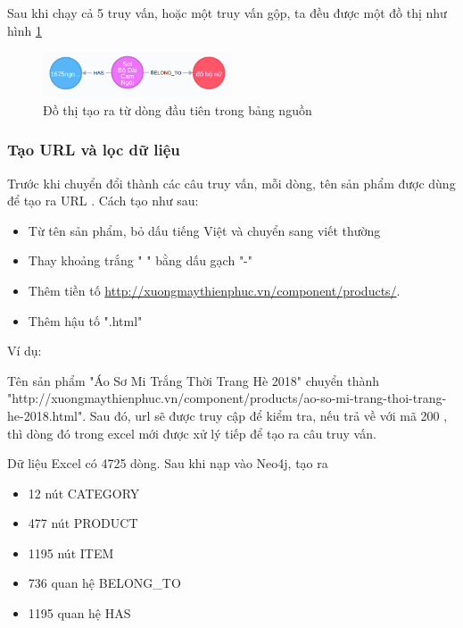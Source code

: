 \bigskip

Sau khi chạy cả 5 truy vấn, hoặc một truy vấn gộp, ta đều được một đồ thị như hình \ref{fig:cypher} 

\begin{figure}[h]
\centering
\includegraphics[width=0.5\textwidth]{imagev2/merge5cypher.png}
\caption{\label{fig:cypher} Đồ thị tạo ra từ dòng đầu tiên trong bảng nguồn}
\end{figure}

\subsubsection{Tạo URL và lọc dữ liệu}

Trước khi chuyển đổi thành các câu truy vấn, mỗi dòng, tên sản phẩm được dùng để tạo ra URL . Cách tạo như sau: 

\begin{itemize}
\item Từ tên sản phẩm, bỏ dấu tiếng Việt và chuyển sang viết thường 
\item Thay khoảng trắng " " bằng dấu gạch "-" 
\item Thêm tiền tố  \url{http://xuongmaythienphuc.vn/component/products/}.
\item Thêm hậu tố ".html"
\end{itemize}

Ví dụ: 

Tên sản phẩm "Áo Sơ Mi Trắng Thời Trang Hè 2018" chuyển thành "http://xuongmaythienphuc.vn/component/products/ao-so-mi-trang-thoi-trang-he-2018.html". Sau đó, url sẽ được truy cập để kiểm tra, nếu trả về với mã 200 , thì dòng đó trong excel mới được xử lý tiếp để tạo ra câu truy vấn. 

Dữ liệu Excel có 4725 dòng. Sau khi nạp vào Neo4j, tạo ra 

\begin{itemize}
\item 12 nút CATEGORY 
\item 477 nút PRODUCT 
\item 1195 nút ITEM 
\item 736 quan hệ BELONG\_TO 
\item 1195 quan hệ HAS 
\end{itemize}



